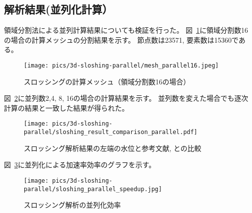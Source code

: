 \newpage
\subsection{解析結果(並列化計算）}

領域分割法による並列計算結果についても検証を行った。
図~\ref{fig:3d-sloshing-mesh-parallel16}に領域分割数16の場合の計算メッシュの分割結果を示す。
節点数は23571, 要素数は15360である。

\begin{figure}[H]
    \centering
    \texttt{[image: pics/3d-sloshing-parallel/mesh\_parallel16.jpeg]}
	\caption{スロッシングの計算メッシュ（領域分割数16の場合）}
	\label{fig:3d-sloshing-mesh-parallel16}
\end{figure}

図~\ref{fig:3d-sloshing-result-parallel}に並列数2,4, 8, 16の場合の計算結果を示す。
並列数を変えた場合でも逐次計算の結果と一致した結果が得られた。

\begin{figure}[H]
    \centering
	\texttt{[image: pics/3d-sloshing-parallel/sloshing\_result\_comparison\_parallel.pdf]}
	\caption{スロッシング解析結果の左端の水位と参考文献\cite{Okamoto1992}, \cite{Sakuraba2001}との比較}
	\label{fig:3d-sloshing-result-parallel}
\end{figure}

図~\ref{fig:3d-sloshing-parallel-speedup}に並列化による加速率効率のグラフを示す。
\begin{figure}[H]
    \centering
	\texttt{[image: pics/3d-sloshing-parallel/sloshing\_parallel\_speedup.jpg]}
	\caption{スロッシング解析の並列化効率}
	\label{fig:3d-sloshing-parallel-speedup}
\end{figure}